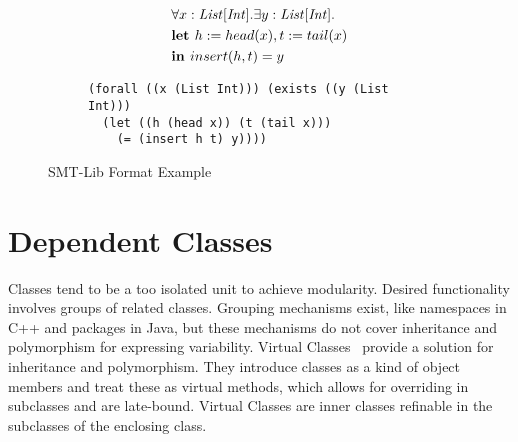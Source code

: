 \begin{figure}[t]
\begin{subfigure}{1\textwidth}
\begin{align*}
&\forall x: \mathit{List[Int]}. \exists y: \mathit{List[Int]}. \\
&\textbf{let } h := head(x), t := tail(x)\\
&\textbf{in } insert(h, t) = y
\end{align*}
\label{fig:smtlib-example-fo}
\end{subfigure}
\begin{subfigure}{1\textwidth}
\begin{lstlisting}[language=smtlib]
(forall ((x (List Int))) (exists ((y (List Int)))
  (let ((h (head x)) (t (tail x)))
    (= (insert h t) y))))
\end{lstlisting}
\label{fig:smtlib-example-smtlib}
\end{subfigure}
\caption{SMT-Lib Format Example}
\label{fig:smtlib-example}
\end{figure}

\section{Dependent Classes}
\label{sec:depcls}
Classes tend to be a too isolated unit to achieve modularity.
Desired functionality involves groups of related classes.
Grouping mechanisms exist, like namespaces in C++ and packages in Java,
but these mechanisms do not cover inheritance and polymorphism for expressing variability.
Virtual Classes~\cite{virtual:classes, vaidas:thesis} provide a solution for inheritance and polymorphism.
They introduce classes as a kind of object members and treat these as virtual methods,
which allows for overriding in subclasses and are late-bound.
Virtual Classes are inner classes refinable in the subclasses of the enclosing class. %

